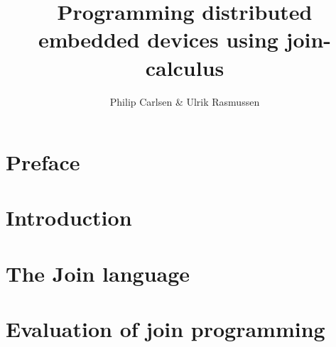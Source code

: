 \documentclass[a4paper, oneside, draft]{memoir}
\title{Programming distributed embedded devices using join-calculus}
\author{Philip Carlsen \& Ulrik Rasmussen}
\begin{document}
\newtheorem{theorem}{Theorem}


\lstset{language=join,
        basicstyle=\small
}

\frontmatter

\maketitle
\begin{abstract}

\end{abstract}

\clearpage
\chapter*{Preface}


\clearpage

\tableofcontents*

\mainmatter

\chapter{Introduction}


\chapter{The Join language}


\chapter{Evaluation of join programming}






\end{document}
